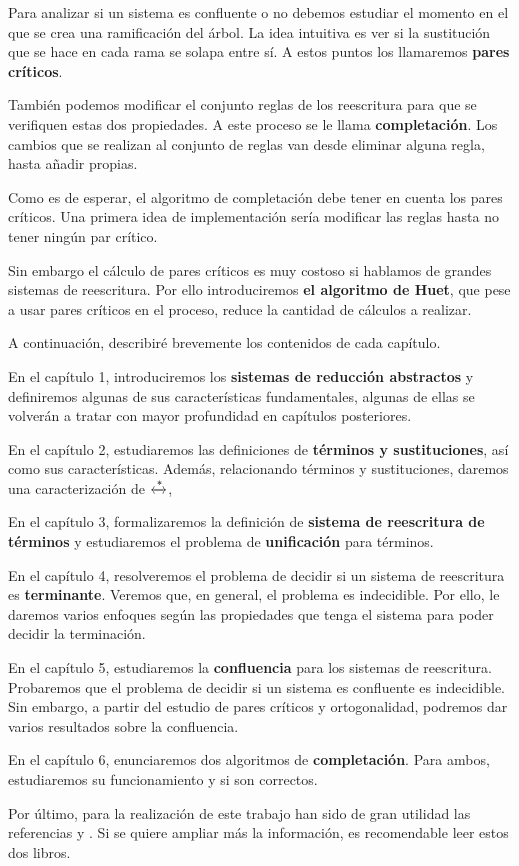 Para analizar si un sistema es confluente o no debemos estudiar el
momento en el que se crea una ramificación del árbol. La idea
intuitiva es ver si la sustitución que se hace en cada rama se solapa
entre sí. A estos puntos los llamaremos \textbf{pares críticos}.

También podemos modificar el conjunto reglas de los reescritura para
que se verifiquen estas dos propiedades. A este proceso se le llama
\textbf{completación}. Los cambios que se realizan al conjunto de reglas van
desde eliminar alguna regla, hasta añadir propias.

Como es de esperar, el algoritmo de completación debe tener en cuenta
los pares críticos. Una primera idea de implementación sería modificar
las reglas hasta no tener ningún par crítico.

Sin embargo el cálculo de pares críticos es muy costoso si hablamos de
grandes sistemas de reescritura. Por ello introduciremos \textbf{el algoritmo
de Huet}, que pese a usar pares críticos en el proceso, reduce la
cantidad de cálculos a realizar.

A continuación, describiré brevemente los contenidos de cada capítulo.

En el capítulo 1, introduciremos los \textbf{sistemas de reducción abstractos} y
definiremos algunas de sus características fundamentales, algunas de
ellas se volverán a tratar con mayor profundidad en capítulos
posteriores.

En el capítulo 2, estudiaremos las definiciones de \textbf{términos y
sustituciones}, así como sus características. Además, relacionando
términos y sustituciones, daremos una caracterización de
$\xleftrightarrow{*}$,

En el capítulo 3, formalizaremos la definición de \textbf{sistema de
reescritura de términos} y estudiaremos el problema de \textbf{unificación} para
términos.

En el capítulo 4, resolveremos el problema de decidir si un sistema de
reescritura es \textbf{terminante}. Veremos que, en general, el problema es
indecidible. Por ello, le daremos varios enfoques según las
propiedades que tenga el sistema para poder decidir la terminación.

En el capítulo 5, estudiaremos la \textbf{confluencia} para los sistemas de
reescritura. Probaremos que el problema de decidir si un sistema es
confluente es indecidible. Sin embargo, a partir del estudio de pares
críticos y ortogonalidad, podremos dar varios resultados sobre la
confluencia.

En el capítulo 6, enunciaremos dos algoritmos de
\textbf{completación}. Para ambos, estudiaremos su funcionamiento y si son
correctos.

Por último, para la realización de este trabajo han sido de gran
utilidad las referencias \cite{Nipkow} y \cite{Harrison}. Si se quiere
ampliar más la información, es recomendable leer estos dos libros.

